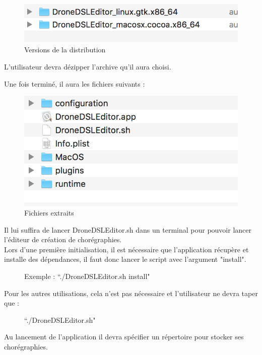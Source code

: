\documentclass[12pt]{article}
\begin{document}
        \begin{figure}[!h]
        \centering
        \includegraphics[scale=0.75]{Distrib.png}
        \caption{Versions de la distribution}
        \end{figure}
        
        L'utilisateur devra dézipper l'archive qu'il aura choisi.
        
        Une fois terminé, il aura les fichiers suivants :
        
        
        \begin{figure}[!h]
        \centering
        \includegraphics[scale=0.75]{Contenu.png}
        \caption{Fichiers extraits}
        \end{figure}
        
        Il lui suffira de lancer DroneDSLEditor.sh dans un terminal pour pouvoir lancer l'éditeur de création de chorégraphies. \\
        Lors d'une première initialisation, il est nécessaire que l'application récupère et installe des dépendances, il faut donc lancer le script avec l'argument "install". 
        
            \begin{figure}[!h]
         \centering Exemple : “./DroneDSLEditor.sh install"\\
         \end{figure}
        Pour les autres utilisations, cela n'est pas nécessaire et l'utilisateur ne devra taper que : \\
       \begin{figure}[!h]
        \centering “./DroneDSLEditor.sh"\\
        \end{figure}
        \newpage
        Au lancement de l'application il devra spécifier un répertoire pour stocker ses chorégraphies.
        
\end{document}
